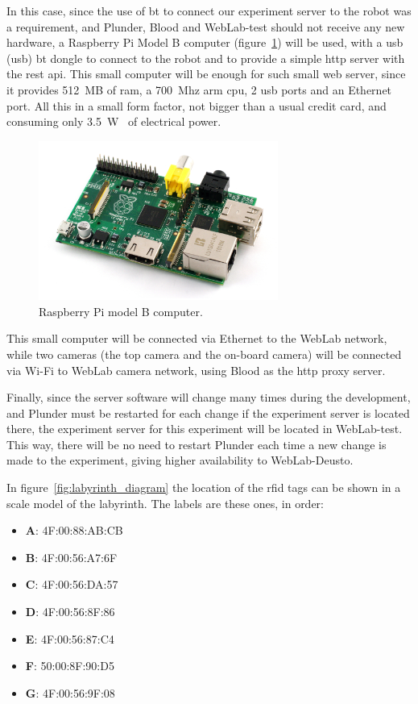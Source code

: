 In this case, since the use of \acrlong{bt} to connect our experiment server to the robot was a
requirement, and Plunder, Blood and WebLab-test should not receive any new hardware, a Raspberry Pi
Model B computer (figure~\ref{fig:rasp}) will be used, with a \acrshort{usb} (\acrlong{usb})
\acrlong{bt} dongle to connect to the robot and to provide a simple \acrshort{http} server with the
\acrshort{rest} \acrshort{api}. This small computer will be enough for such small web server, since
it provides 512~MB of \acrshort{ram}, a 700~Mhz \acrshort{arm} \acrshort{cpu}, 2 \acrshort{usb}
ports and an Ethernet port. All this in a small form factor, not bigger than a usual credit card,
and consuming only 3.5~W~\cite{rasp_b} of electrical power.

\begin{figure}[!htbp]
	\centering
	\includegraphics[width=0.7\textwidth]{fig/rasp.jpg}
	\caption{Raspberry Pi model B computer.}
	\label{fig:rasp}
\end{figure}

This small computer will be connected via Ethernet to the WebLab network, while two cameras (the top
camera and the on-board camera) will be connected via Wi-Fi to WebLab camera network, using Blood as
the \acrshort{http} proxy server.

Finally, since the server software will change many times during the development, and Plunder must
be restarted for each change if the experiment server is located there, the experiment server for
this experiment will be located in WebLab-test. This way, there will be no need to restart Plunder
each time a new change is made to the experiment, giving higher availability to WebLab-Deusto.

In figure~\ref{fig:labyrinth_diagram} the location of the \acrshort{rfid} tags can be shown in a
scale model of the labyrinth. The labels are these ones, in order:

\begin{itemize}
	\item \textbf{A}: 4F:00:88:AB:CB
	\item \textbf{B}: 4F:00:56:A7:6F
	\item \textbf{C}: 4F:00:56:DA:57
	\item \textbf{D}: 4F:00:56:8F:86
	\item \textbf{E}: 4F:00:56:87:C4
	\item \textbf{F}: 50:00:8F:90:D5
	\item \textbf{G}: 4F:00:56:9F:08
\end{itemize}

